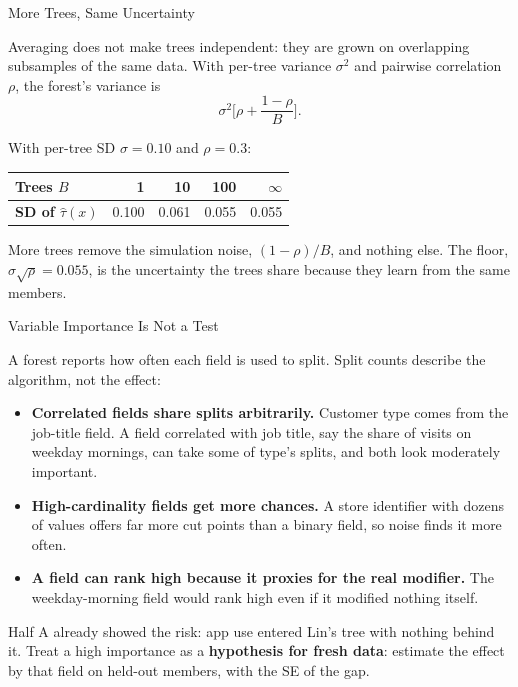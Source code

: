 \documentclass[aspectratio=169, 11pt, handout]{beamer}
\newcommand{\hatt}{\hat{\tau}}
\begin{document}
\begin{frame}{More Trees, Same Uncertainty}

Averaging does not make trees independent: they are grown on overlapping subsamples of the same data. With per-tree variance $\sigma^2$ and pairwise correlation $\rho$, the forest's variance is
\[
\sigma^2\Big[\rho + \frac{1-\rho}{B}\Big].
\]

With per-tree SD $\sigma = 0.10$ and $\rho = 0.3$:

\begin{center}
\begin{tabular}{lrrrr}
\toprule
\textbf{Trees $B$} & 1 & 10 & 100 & $\infty$ \\
\midrule
\textbf{SD of $\hatt(x)$} & 0.100 & 0.061 & 0.055 & 0.055 \\
\bottomrule
\end{tabular}
\end{center}

\bigskip

More trees remove the simulation noise, $(1-\rho)/B$, and nothing else. The floor, $\sigma\sqrt\rho = 0.055$, is the uncertainty the trees share because they learn from the same members.
\end{frame}

\begin{frame}{Variable Importance Is Not a Test}

A forest reports how often each field is used to split. Split counts describe the algorithm, not the effect:

\bigskip

\begin{itemize}
  \item \textbf{Correlated fields share splits arbitrarily.} Customer type comes from the job-title field. A field correlated with job title, say the share of visits on weekday mornings, can take some of type's splits, and both look moderately important.
  \item \textbf{High-cardinality fields get more chances.} A store identifier with dozens of values offers far more cut points than a binary field, so noise finds it more often.
  \item \textbf{A field can rank high because it proxies for the real modifier.} The weekday-morning field would rank high even if it modified nothing itself.
\end{itemize}

\bigskip

Half A already showed the risk: app use entered Lin's tree with nothing behind it. Treat a high importance as a \textbf{hypothesis for fresh data}: estimate the effect by that field on held-out members, with the SE of the gap.
\end{frame}
\end{document}
